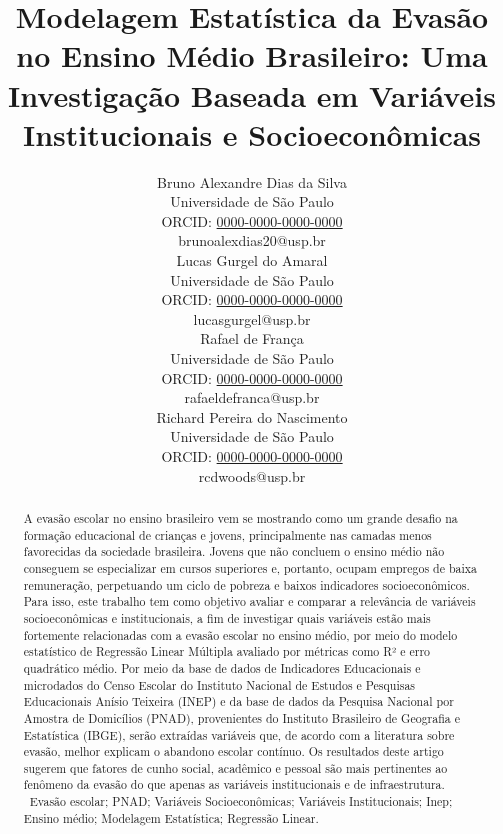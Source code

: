 \documentclass[english, spanish, brazilian]{RBIEarticle} %
\title{Modelagem Estatística da Evasão no Ensino Médio Brasileiro: Uma Investigação Baseada em Variáveis Institucionais e Socioeconômicas}
\author{%
	\parbox{3.8cm}{%
		Bruno Alexandre Dias da Silva\\
		Universidade de São Paulo\\
		ORCID: \href{https://orcid.org/0000-0000-0000-0000}{0000-0000-0000-0000}\\
		brunoalexdias20@usp.br
	}
        \hspace{0.3cm}
	\parbox{3.8cm}{%
		Lucas Gurgel do Amaral\\
		Universidade de São Paulo\\
		ORCID: \href{https://orcid.org/0000-0000-0000-0000}{0000-0000-0000-0000}\\
		lucasgurgel@usp.br
	}
        \hspace{0.3cm}
        \parbox{3.8cm}{%
		Rafael de França\\
		Universidade de São Paulo\\
		ORCID: \href{https://orcid.org/0000-0000-0000-0000}{0000-0000-0000-0000}\\
		rafaeldefranca@usp.br
	}
        \hspace{0.3cm}
	\parbox{3.9cm}{\raggedright%
		Richard Pereira do Nascimento\\
		Universidade de São Paulo\\
		ORCID: \href{https://orcid.org/0000-0000-0000-0000}{0000-0000-0000-0000}\\
		rcdwoods@usp.br
	}
}
\begin{document}
\maketitle

\begin{otherlanguage}{brazilian}
\begin{abstract}
A evasão escolar no ensino brasileiro vem se mostrando como um grande desafio na formação educacional de crianças e jovens, principalmente nas camadas menos favorecidas da sociedade brasileira. Jovens que não concluem o ensino médio não conseguem se especializar em cursos superiores e, portanto, ocupam empregos de baixa remuneração, perpetuando um ciclo de pobreza e baixos indicadores socioeconômicos. Para isso, este trabalho tem como objetivo avaliar e comparar a relevância de variáveis socioeconômicas e institucionais, a fim de investigar quais variáveis estão mais fortemente relacionadas com a evasão escolar no ensino médio, por meio do modelo estatístico de Regressão Linear Múltipla avaliado por métricas como R² e erro quadrático médio. Por meio da base de dados de Indicadores Educacionais e microdados do Censo Escolar do Instituto Nacional de Estudos e Pesquisas Educacionais Anísio Teixeira (INEP) e da base de dados da Pesquisa Nacional por Amostra de Domicílios (PNAD), provenientes do Instituto Brasileiro de Geografia e Estatística (IBGE), serão extraídas variáveis que, de acordo com a literatura sobre evasão, melhor explicam o abandono escolar contínuo. Os resultados deste artigo sugerem que fatores de cunho social, acadêmico e pessoal são mais pertinentes ao fenômeno da evasão do que apenas as variáveis institucionais e de infraestrutura.
\keywords\ Evasão escolar; PNAD; Variáveis Socioeconômicas; Variáveis Institucionais; Inep; Ensino médio; Modelagem Estatística; Regressão Linear.
\end{abstract}
\end{otherlanguage}
\end{document}
